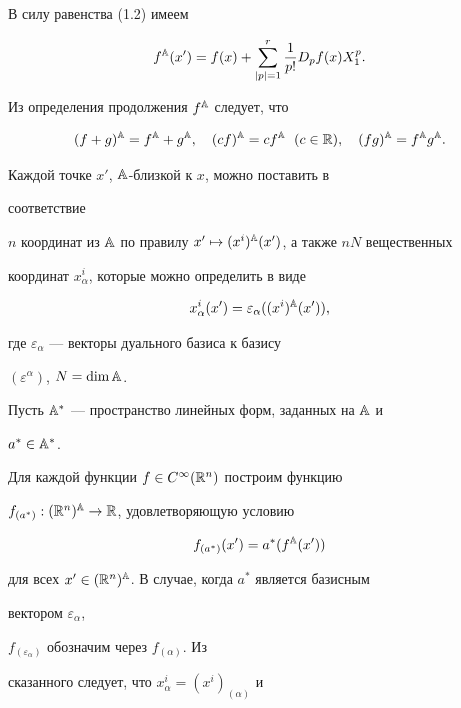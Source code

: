  


В силу равенства (1.2) имеем 


$$ 


f\A(x')=f(x)+\sum^r_{|p|=1}\frac{1}{p!}D_p f(x)X^p_1. 


$$ 


Из определения продолжения $f^{\Bbb A}$ следует, что 


$$ 


(f+g)\A=f\A+g\A,\quad 


(c f)\A=c f\A\ \; (c\in\Bbb R),\quad 


(f g)\A=f\A g\A. 


$$ 


 


Каждой точке $x'$, $\Bbb A$-близкой к $x$, можно поставить в 


соответствие 


$n$ координат из $\Bbb A$ по правилу $x'\mapsto(x^i)\A(x')$, а также $n 


N$ вещественных 


координат $x^i_\alpha$, которые можно определить в виде


$$ 


x^i_\alpha(x')=\varepsilon_\alpha((x^i)\A(x')), 


$$ 


где $\varepsilon_\alpha$ --- векторы дуального базиса к базису 


$(\varepsilon^\alpha)$, $N=\dim\Bbb A$. 


 


Пусть $\Bbb A^*$ --- пространство линейных форм, заданных на $\Bbb A$ и 


$a^*\in\Bbb A^*$. 


Для каждой функции $f\in C^\infty(\Bbb R^n)$ построим функцию 


$f_{(a^*)}:(\Bbb R^n)^{\Bbb A}\to\Bbb R$, удовлетворяющую условию 


$$ 


f_{(a^*)}(x')=a^*(f\A(x')) 


$$ 


для всех $x'\in(\Bbb R^n)^{\Bbb A}$. В случае, когда $a^*$ является базисным 


вектором $\varepsilon_\alpha$, 


$f_{(\varepsilon_\alpha)}$ обозначим через $f_{(\alpha)}$. Из 


сказанного следует, что $x^i_\alpha=(x^i)_{(\alpha)}$ и 


$$ 


